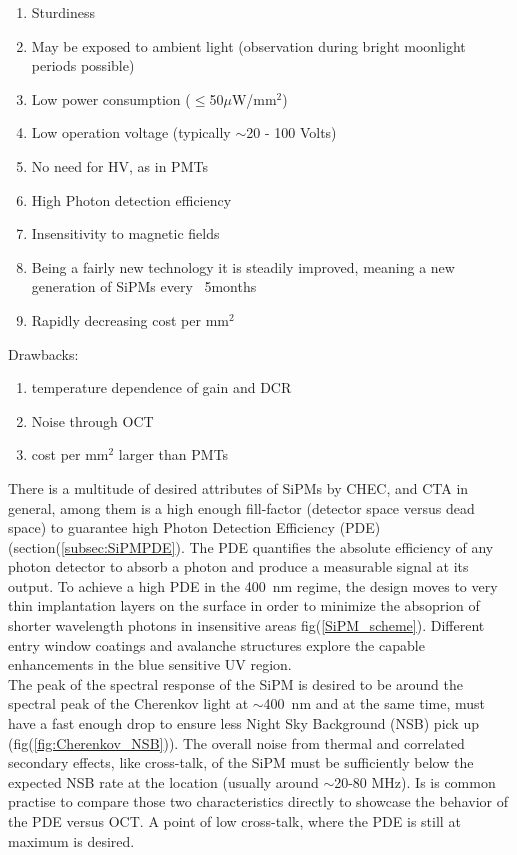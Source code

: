 \documentclass[12pt,article,type=msc,colorback,accentcolor=tud9c]{tudthesis}
\begin{document}
\begin{multicols}{2}
\begin{enumerate}[topsep=0pt,itemsep=-1ex,partopsep=1ex,parsep=1ex]
\item Sturdiness
\item May be exposed to ambient light (observation during bright moonlight periods possible)
\item Low power consumption ($\leq$50$\mu$W/mm$^2$)
\item Low operation voltage (typically $\sim$20 - 100 Volts)
\item No need for HV, as in PMTs
\item High Photon detection efficiency
\item Insensitivity to magnetic fields
\item Being a fairly new technology it is steadily improved, meaning a new generation of SiPMs every ~5months
\item Rapidly decreasing cost per mm$^2$
\end{enumerate}
\end{multicols}
\noindent
Drawbacks:\\
\begin{enumerate}[topsep=0pt,itemsep=-1ex,partopsep=1ex,parsep=1ex]
\item temperature dependence of gain and DCR
\item Noise through OCT
\item cost per mm$^2$ larger than PMTs
\end{enumerate}
\noindent
\newline
There is a multitude of desired attributes of SiPMs by CHEC, and CTA in general, among them is a high enough fill-factor (detector space versus dead space) to guarantee high Photon Detection Efficiency (PDE) (section(\ref{subsec:SiPMPDE}). The PDE quantifies the absolute efficiency of any photon detector to absorb a photon and produce a measurable signal at its output. To achieve a high PDE in the 400~nm regime, the design moves to very thin implantation layers on the surface in order to minimize the absoprion of shorter wavelength photons in insensitive areas fig(\ref{SiPM_scheme}). Different entry window coatings and avalanche structures explore the capable enhancements in the blue sensitive UV region.\\
The peak of the spectral response of the SiPM is desired to be around the spectral peak of the Cherenkov light at $\sim$400~nm and at the same time, must have a fast enough drop to ensure less Night Sky Background (NSB) pick up (fig(\ref{fig:Cherenkov_NSB})). The overall noise from thermal and correlated secondary effects, like cross-talk, of the SiPM must be sufficiently below the expected NSB rate at the location (usually around $\sim$20-80 MHz\cite{SiPMvsMAPMT}). Is is common practise to compare those two characteristics directly to showcase the behavior of the PDE versus OCT. A point of low cross-talk, where the PDE is still at maximum is desired.\\
\end{document}
